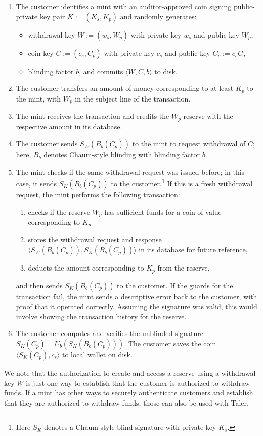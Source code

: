 \documentclass{llncs}
\begin{document}
\begin{enumerate}
  \item The customer identifies a mint with an auditor-approved
        coin signing public-private key pair $K := (K_s, K_p)$
        and randomly generates:
        \begin{itemize}
           \item withdrawal key $W := (w_s,W_p)$ with private key $w_s$ and public key $W_p$,
           \item coin key $C := (c_s,C_p)$ with private key $c_s$ and public key $C_p := c_s G$,
           \item blinding factor $b$, and commits $\langle W, C, b \rangle$ to disk.
        \end{itemize}
  \item The customer transfers an amount of money corresponding to at least $K_p$ to the mint, with $W_p$ in the subject line of the transaction.
  \item The mint receives the transaction and credits the $W_p$ reserve with the respective amount in its database.
  \item The customer sends $S_W(B_b(C_p))$ to the mint to request withdrawal of $C$; here, $B_b$ denotes Chaum-style blinding with blinding factor $b$.
  \item The mint checks if the same withdrawal request was issued before; in this case, it sends $S_{K}(B_b(C_p))$ to the customer.\footnote{Here $S_K$
        denotes a Chaum-style blind signature with private key $K_s$.}
        If this is a fresh withdrawal request, the mint performs the following transaction:
        \begin{enumerate}
           \item checks if the reserve $W_p$ has sufficient funds for a coin of value corresponding to $K_p$
           \item stores the withdrawal request and response $\langle S_W(B_b(C_p)), S_K(B_b(C_p)) \rangle$ in its database for future reference,
           \item deducts the amount corresponding to $K_p$ from the reserve,
        \end{enumerate}
        and then sends $S_{K}(B_b(C_p))$ to the customer.
        If the guards for the transaction fail, the mint sends a descriptive error back to the customer,
        with proof that it operated correctly.
        Assuming the signature was valid, this would involve showing the transaction history for the reserve.
  \item The customer computes and verifies the unblinded signature $S_K(C_p) = U_b(S_K(B_b(C_p)))$.
        The customer saves the coin $\langle S_K(C_p), c_s \rangle$ to local wallet on disk.
\end{enumerate}
We note that the authorization to create and access a reserve using a
withdrawal key $W$ is just one way to establish that the customer is
authorized to withdraw funds.  If a mint has other ways to securely
authenticate customers and establish that they are authorized to
withdraw funds, those can also be used with Taler.
\end{document}
